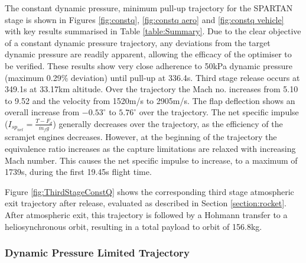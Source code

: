 \documentclass[journal]{new-aiaa}
\newcommand{\PayloadToOrbitConstq}{156.8}
\newcommand{\SeparationAltConstq}{33.17}
\newcommand{\SeparationvConstq}{2905}
\newcommand{\FlightTimeConstq}{349.1}
\begin{document}
 The constant dynamic pressure, minimum pull-up trajectory for the SPARTAN stage is shown in Figures \ref{fig:constq}, \ref{fig:constq aero} and \ref{fig:constq vehicle} with key results summarised in Table \ref{table:Summary}. Due to the clear objective of a constant dynamic pressure trajectory, any deviations from the target dynamic pressure are readily apparent, allowing the efficacy of the optimiser to be verified. 
 These results show very close adherence to 50kPa dynamic pressure (maximum 0.29\% deviation) until pull-up at 336.4s. Third stage release occurs at \FlightTimeConstq s at \SeparationAltConstq km altitude. 
 Over the trajectory the Mach no. increases from 5.10 to 9.52 and the velocity from 1520m/s to \SeparationvConstq m/s. The flap deflection shows an overall increase from $-0.53^\circ$ to $5.76^\circ$ over the trajectory.  The net specific impulse ($I_{sp_{net}} = \frac{T-F_d}{\dot{m}_f g}$) generally decreases over the trajectory, as the efficiency of the scramjet engines decreases. However, at the beginning of the trajectory the equivalence ratio increases as the capture limitations are relaxed with increasing Mach number. This causes the net specific impulse to increase, to a maximum of 1739s, during the first 19.45s flight time. 

Figure \ref{fig:ThirdStageConstQ} shows the corresponding third stage atmospheric exit trajectory after release, evaluated as described in Section \ref{section:rocket}. After atmospheric exit, this trajectory is followed by a Hohmann transfer to a heliosynchronous orbit, resulting in a total payload to orbit of \PayloadToOrbitConstq kg.



\subsubsection{Dynamic Pressure Limited Trajectory} \label{subsection:50kPalimit}
\end{document}
